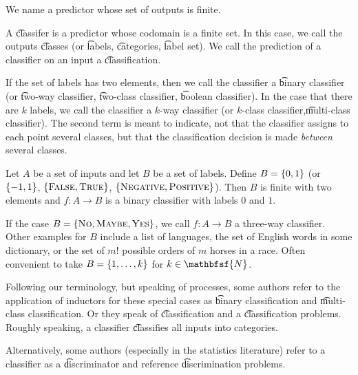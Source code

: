 
We name a predictor whose set of outputs is finite.

A \t{classifer} is a predictor whose codomain is a finite set.
In this case, we call the outputs \t{classes} (or \t{labels}, \t{categories}, \t{label set}).
We call the prediction of a classifier on an input a \t{classification}.

If the set of labels has two elements, then we call the classifier a \t{binary classifier} (or \t{two-way classifier}, \t{two-class classifier}, \t{boolean classifier}).
In the case that there are $k$ labels, we call the classifier a \t{$k$-way classifier} (or \t{$k$-class classifier},\t{multi-class classifier}).
The second term is meant to indicate, not that the classifier assigns to each point several classes, but that the classification decision is made \textit{between} several classes.

Let $A$ be a set of inputs and let $B$ be a set of labels.
Define $B = \{0, 1\}$ (or $\{-1,1 \}$, $\{\textsc{False}, \textsc{True}\}$, $\{\textsc{Negative}, \textsc{Positive}\}$).
Then $B$ is finite with two elements and $f: A \to B$ is a binary classifier with labels $0$ and $1$.

If the case $B = \{\text{\textsc{No}}, \textsc{Maybe}, \textsc{Yes}\}$, we call $f: A \to B$ a three-way classifier.
Other examples for $B$ include a list of languages, the set of English words in some dictionary, or the set of $m!$ possible orders of $m$ horses in a race.
Often convenient to take $B = \{1, \dots, k\}$ for $k \in \mathbfsf{N}$.

Following our terminology, but speaking of processes, some authors refer to the application of inductors for these special cases as \t{binary classification} and \t{multi-class classification}.
Or they speak of \t{classification} and a \t{classification problems}.
Roughly speaking, a classifier \t{classifies} all inputs into categories.

Alternatively, some authors (especially in the statistics literature) refer to a classifier as a \t{discriminator} and reference \t{discrimination problems}.
